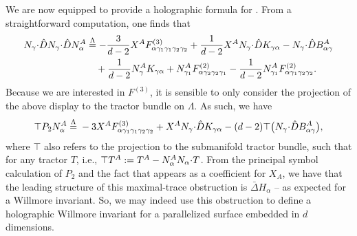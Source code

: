 \documentclass[pdftex]{sigma}
\numberwithin{equation}{section}
\newcommand{\hd }{\hat{D}}
\renewcommand{\=}{\stackrel \Lambda =}
\newcommand{\csdot}{\hspace{-0.75mm} \cdot \hspace{-0.75mm}}
\begin{document}
We are now equipped to provide a holographic formula for . From a straightforward computation, one finds that
\begin{align*}
\begin{split}
N_{\gamma} \csdot \hd N_{\gamma} \csdot \hd N_{\alpha}^A &{}\= -\frac{3}{d-2} X^A F^{(3)}_{\alpha \gamma_1 \gamma_1 \gamma_2 \gamma_2} + \frac{1}{d-2} X^A N_{\gamma} \csdot \hd K_{\gamma \alpha} - N_{\gamma} \csdot \hd B^A_{\alpha \gamma} \\
&\quad{}+ \frac{1}{d-2} N^A_{\gamma} K_{\gamma \alpha} + N^A_{\gamma_1} F^{(2)}_{\alpha \gamma_2 \gamma_2 \gamma_1} - \frac{1}{d-2} N^A_{\gamma_1} F^{(2)}_{\alpha \gamma_1 \gamma_2 \gamma_2} .
\end{split}
\end{align*}
Because we are interested in $F^{(3)}$, it is sensible to only consider the projection of the above display to the tractor bundle on $\Lambda$. As such, we have
\begin{align*} %
\top P_{2} N_{\alpha}^A \={} -3 X^A F^{(3)}_{\alpha \gamma_1 \gamma_1 \gamma_2 \gamma_2} + X^A N_{\gamma} \csdot \hd K_{\gamma \alpha} - (d-2) \top \bigl(N_{\gamma} \csdot \hd B^A_{\alpha \gamma}\bigr) ,
\end{align*}
where $\top$ also refers to the projection to the submanifold tractor bundle, such that \smash{$N^A_{\alpha} T^\top_A \= 0$} for any tractor $T$, i.e., $\top T^A := T^A - N^A_{\alpha} N_{\alpha} \csdot T$. From the principal symbol calculation of $P_2$ and the fact that  appears as a coefficient for $X_A$, we have that the leading structure of this maximal-trace obstruction is $\bar{\Delta} H_{\alpha}$ -- as expected for a Willmore invariant. So, we may indeed use this obstruction to define a holographic Willmore invariant for a parallelized surface embedded in $d$ dimensions.
\end{document}
